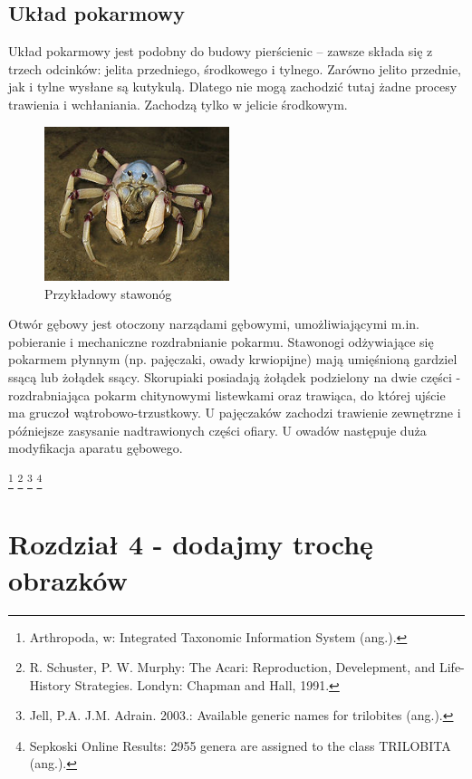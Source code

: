 \documentclass{article}
\begin{document}
\subsection{Układ pokarmowy}
Układ pokarmowy jest podobny do budowy pierścienic – zawsze składa się z trzech odcinków: jelita przedniego, środkowego i tylnego. Zarówno jelito przednie, jak i tylne wysłane są kutykulą. Dlatego nie mogą zachodzić tutaj żadne procesy trawienia i wchłaniania. Zachodzą tylko w jelicie środkowym. 
\begin{figure}
\begin{center}
\vspace{-20pt}
\includegraphics[width=0.48\textwidth]{staw.jpg}
\end{center}
\vspace{-20pt}
\caption{Przykładowy stawonóg}
\vspace{-10pt}
\end{figure}
Otwór gębowy jest otoczony narządami gębowymi, umożliwiającymi m.in. pobieranie i mechaniczne rozdrabnianie pokarmu. Stawonogi odżywiające się pokarmem płynnym (np. pajęczaki, owady krwiopijne) mają umięśnioną gardziel ssącą lub żołądek ssący. Skorupiaki posiadają żołądek podzielony na dwie części - rozdrabniająca pokarm chitynowymi listewkami\cite{czwarty} oraz trawiąca, do której ujście ma gruczoł wątrobowo-trzustkowy. U pajęczaków zachodzi trawienie zewnętrzne i późniejsze zasysanie nadtrawionych części ofiary. U owadów następuje duża modyfikacja aparatu gębowego. 

\footnote[1]{Arthropoda, w: Integrated Taxonomic Information System (ang.).}
\footnote[2]{R. Schuster, P. W. Murphy: The Acari: Reproduction, Develepment, and Life-History Strategies. Londyn: Chapman and Hall, 1991.}
\footnote[3]{Jell, P.A. J.M. Adrain. 2003.: Available generic names for trilobites (ang.).}
\footnote[4]{Sepkoski Online Results: 2955 genera are assigned to the class TRILOBITA (ang.).}

\newpage
\section{Rozdział 4 - dodajmy trochę obrazków}
\end{document}
